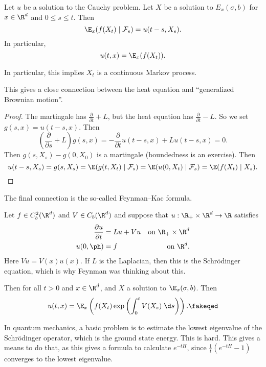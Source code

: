 \documentclass[a4paper]{article}
\begin{document}
\begin{thm}
  Let $u$ be a solution to the Cauchy problem. Let $X$ be a solution to $E_x(\sigma, b)$ for $x \in \R^d$ and $0 \leq s \leq t$. Then
  \[
    \E_x(f(X_t) \mid \mathcal{F}_s) = u(t - s, X_s).
  \]
  In particular,
  \[
    u(t, x) = \E_x(f(X_t)).
  \]
\end{thm}
In particular, this implies $X_t$ is a continuous Markov process.

This gives a close connection between the heat equation and ``generalized Brownian motion''.

\begin{proof}
  The martingale has $\frac{\partial}{\partial t} + L$, but the heat equation has $\frac{\partial}{\partial t} - L$. So we set $g(s, x) = u(t - s, x)$. Then
  \[
    \left(\frac{\partial}{\partial s} + L\right) g(s, x) = - \frac{\partial}{\partial t} u(t - s, x) + Lu(t - s, x) = 0.
  \]
  Then $g(s, X_s) - g(0, X_0)$ is a martingale (boundedness is an exercise). Then
  \[
    u(t - s, X_s) = g(s, X_s) = \E (g(t, X_t) \mid \mathcal{F}_s) = \E(u(0, X_t) \mid \mathcal{F}_s) = \E(f(X_t) \mid X_s).\qedhere
  \]
\end{proof}

The final connection is the so-called Feynman--Kac formula.
\begin{thm}
  Let $f \in C_b^2(\R^d)$ and $V \in C_b(\R^d)$ and suppose that $u: \R_+ \times \R^d \to \R$ satisfies
  \begin{align*}
    \frac{\partial u}{\partial t} &= Lu + Vu & \text{on }\R_+ \times \R^d\\
    u(0, \ph) &= f &\text{on } \R^d.
  \end{align*}
  Here $Vu = V(x) u(x)$. If $L$ is the Laplacian, then this is the Schr\"odinger equation, which is why Feynman was thinking about this.

  Then for all $t > 0$ and $x \in \R^d$, and $X$ a solution to $\E_x(\sigma, b)$. Then
  \[
    u(t, x) = \E_x\left(f(X_t) \exp \left(\int_0^t V(X_s)\;\d s\right)\right).\fakeqed
  \]
\end{thm}
In quantum mechanics, a basic problem is to estimate the lowest eigenvalue of the Schr\"odinger operator, which is the ground state energy. This is hard. This gives a means to do that, as this gives a formula to calculate $e^{-tH}$, since $\frac{1}{t} (e^{-tH} - 1)$ converges to the lowest eigenvalue.

\printindex
\end{document}
